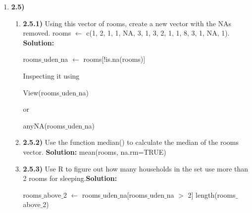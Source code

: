 \documentclass{article}
\begin{document}
\begin{enumerate}
\begin{enumerate}
    \end{enumerate}
    \item \textbf{2.5)}
    \begin{enumerate}
        \item \textbf{2.5.1)} Using this vector of rooms, create a new vector with the NAs removed. rooms $\leftarrow$ c(1, 2, 1, 1, NA, 3, 1, 3, 2, 1, 1, 8, 3, 1, NA, 1). \textbf{Solution:}
\begin{center}
rooms$\_$uden$\_$na $\leftarrow$ rooms[!is.na(rooms)] \newline
\end{center}
Inspecting it using 
\begin{center}
View(rooms$\_$uden$\_$na) 
\end{center}
or
\begin{center}
  anyNA(rooms$\_$uden$\_$na)  
\end{center}
    \item \textbf{2.5.2) }Use the function median() to calculate the median of the rooms vector. \textbf{Solution:} mean(rooms, na.rm=TRUE)
    \item \textbf{2.5.3) }Use R to figure out how many households in the set use more than 2 rooms for sleeping.\textbf{Solution:} 
    \begin{center}
       rooms$\_$above$\_$2 $\leftarrow$ rooms$\_$uden$\_$na[rooms$\_$uden$\_$na $>$ 2] \newline 
       length(rooms$\_$above$\_$2)\newline \vspace{2mm} 
    \end{center}
    \end{enumerate}
\end{enumerate}
\end{document}
